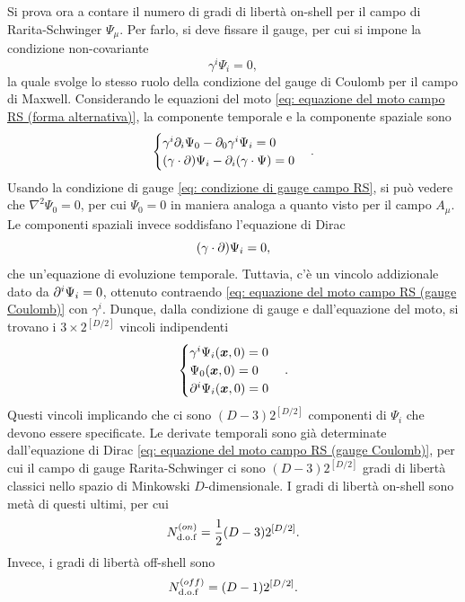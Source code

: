 Si prova ora a contare il numero di gradi di libertà on-shell per il campo di Rarita-Schwinger $\Psi_\mu$. Per farlo, si deve fissare il gauge, per cui si impone la condizione non-covariante
\begin{equation}
\label{eq: condizione di gauge campo RS}
    \gamma^i\Psi_i = 0,
\end{equation}
la quale svolge lo stesso ruolo della condizione del gauge di Coulomb per il campo di Maxwell. Considerando le equazioni del moto \eqref{eq: equazione del moto campo RS (forma alternativa)}, la componente temporale e la componente spaziale sono 
\begin{equation}
    \begin{cases}
        \gamma^i\partial_i\Psi_0 - \partial_0\gamma^i\Psi_i = 0 \\
        (\gamma \cdot \partial)\Psi_i - \partial_i(\gamma \cdot \Psi) = 0
    \end{cases}.
\end{equation}
Usando la condizione di gauge \eqref{eq: condizione di gauge campo RS}, si può vedere che $\nabla^2\Psi_0 = 0$, per cui $\Psi_0 = 0$ in maniera analoga a quanto visto per il campo $A_\mu$. Le componenti spaziali invece soddisfano l'equazione di Dirac 
\begin{equation}
\label{eq: equazione del moto campo RS (gauge Coulomb)}
    (\gamma \cdot \partial)\Psi_i = 0,
\end{equation}
che un'equazione di evoluzione temporale. Tuttavia, c'è un vincolo addizionale dato da $\partial^i\Psi_i = 0$, ottenuto contraendo \eqref{eq: equazione del moto campo RS (gauge Coulomb)} con $\gamma^i$. Dunque, dalla condizione di gauge e dall'equazione del moto, si trovano i $3 \times 2^{[D/2]}$ vincoli indipendenti 
\begin{equation}
    \begin{cases}
        \gamma^i\Psi_i(\bm{x},0) = 0 \\
        \Psi_0(\bm{x},0) = 0 \\
        \partial^i\Psi_i(\bm{x},0) = 0
    \end{cases}.
\end{equation} 
Questi vincoli implicando che ci sono $(D - 3)2^{[D/2]}$ componenti di $\Psi_i$ che devono essere specificate. Le derivate temporali sono già determinate dall'equazione di Dirac \eqref{eq: equazione del moto campo RS (gauge Coulomb)}, per cui il campo di gauge Rarita-Schwinger ci sono $(D - 3)2^{[D/2]}$ gradi di libertà classici nello spazio di Minkowski $D$-dimensionale. I gradi di libertà on-shell sono metà di questi ultimi, per cui 
\begin{equation}
    N_{\mathrm{d.o.f}}^{(on)} = \frac{1}{2}(D - 3)2^{[D/2]}.
\end{equation}
Invece, i gradi di libertà off-shell sono 
\begin{equation}
    N_{\mathrm{d.o.f}}^{(off)} = (D - 1)2^{[D/2]}.
\end{equation}


